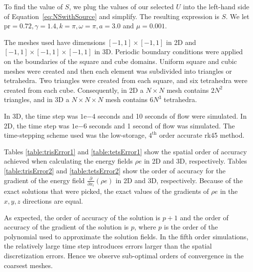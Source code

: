 To find the value of $S$, we plug the values of our selected $U$ into the left-hand side of Equation~\eqref{eq:NSwithSource} and simplify. The resulting expression is $S$. 
We let \gls{pr}$=0.72, \gamma = 1.4, k = \pi, \omega = \pi, a = 3.0$ and $\mu = 0.001$.

The meshes used have dimensions $[-1,1] \times [-1,1]$ in 2D and $[-1,1] \times [-1,1] \times [-1,1]$ in 3D. Periodic boundary conditions were applied on the boundaries of the square and cube domains. Uniform square and cubic meshes were created and then each element was subdivided into triangles or tetrahedra. Two triangles were created from each square, and six tetrahedra were created from each cube. Consequently, in 2D a $N \times N$ mesh contains $2N^2$ triangles, and in 3D a $N \times N \times N$ mesh contains $6N^3$ tetrahedra. 


In 3D, the time step was $1$e$-4$ seconds and 10 seconds of flow were simulated. In 2D, the time step was $1$e$-6$ seconds and 1 second of flow was simulated. The time-stepping scheme used was the low-storage, $4^\text{th}$ order accurate \gls{rk45} method. 







Tables \eqref{table:trisError1} and \eqref{table:tetsError1} show the spatial order of accuracy achieved when calculating the energy fields $\rho e$ in 2D and 3D, respectively. Tables \eqref{table:trisError2} and \eqref{table:tetsError2} show the order of accuracy for the gradient of the energy field $\frac{\partial }{\partial x_i}(\rho e)$ in 2D and 3D, respectively. Because of the exact solutions that were picked, the exact values of the gradients of $\rho e$ in the $x,y,z$ directions are equal.

As expected\cite{hesthaven2007nodal}, the order of accuracy of the solution is $p+1$ and the order of accuracy of the gradient of the solution is $p$, where $p$ is the order of the polynomial used to approximate the solution fields. In the fifth order simulations, the relatively large time step introduces errors larger than the spatial discretization errors. Hence we observe sub-optimal orders of convergence in the coarsest meshes.

